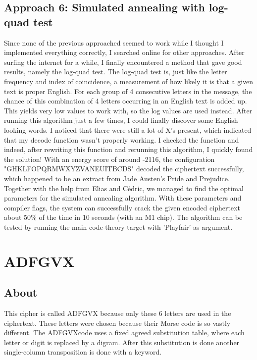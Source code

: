 \documentclass{article}
\begin{document}
\subsection{Approach 6: Simulated annealing with log-quad test}
Since none of the previous approached seemed to work while I thought I implemented everything correctly, I searched online for other approaches. After surfing the internet for a while, I finally encountered a method that gave good results, namely the log-quad test. The log-quad test is, just like the letter frequency and index of coincidence, a measurement of how likely it is that a given text is proper English. For each group of 4 consecutive letters in the message, the chance of this combination of 4 letters occurring in an English text is added up. This yields very low values to work with, so the log values are used instead. After running this algorithm just a few times, I could finally discover some English looking words. I noticed that there were still a lot of X's present, which indicated that my decode function wasn't properly working. I checked the function and indeed, after rewriting this function and rerunning this algorithm, I quickly found the solution! With an energy score of around -2116, the configuration "GHKLFOPQRMWXYZVANEUITBCDS" decoded the ciphertext successfully, which happened to be an extract from Jade Austen's Pride and Prejudice. Together with the help from Elias and Cédric, we managed to find the optimal parameters for the simulated annealing algorithm. With these parameters and compiler flags, the system can successfully crack the given encoded ciphertext about 50\% of the time in 10 seconds (with an M1 chip). The algorithm can be tested by running the main code-theory target with 'Playfair' as argument.


\section{ADFGVX}
\subsection{About}
This cipher is called ADFGVX because only these 6 letters are used in the ciphertext. These letters were chosen because their Morse code is so vastly different. The ADFGVXcode uses a fixed agreed substitution table, where each letter or digit is replaced by a digram.  After this substitution is done another single-column transposition is done with a keyword.
\end{document}

